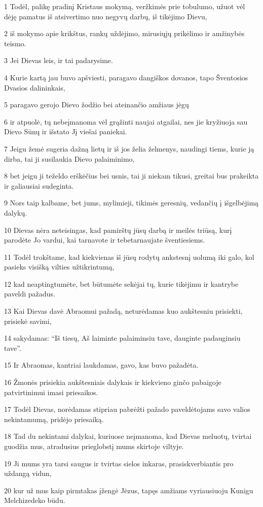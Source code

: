 \par 1 Todėl, palikę pradinį Kristaus mokymą, veržkimės prie tobulumo, užuot vėl dėję pamatus iš atsivertimo nuo negyvų darbų, iš tikėjimo Dievu, 
\par 2 iš mokymo apie krikštus, rankų uždėjimo, mirusiųjų prikėlimo ir amžinybės teismo. 
\par 3 Jei Dievas leis, ir tai padarysime. 
\par 4 Kurie kartą jau buvo apšviesti, paragavo dangiškos dovanos, tapo Šventosios Dvasios dalininkais, 
\par 5 paragavo gerojo Dievo žodžio bei ateinančio amžiaus jėgų 
\par 6 ir atpuolė, tų nebeįmanoma vėl grąžinti naujai atgailai, nes jie kryžiuoja sau Dievo Sūnų ir išstato Jį viešai paniekai. 
\par 7 Jeigu žemė sugeria dažną lietų ir iš jos želia želmenys, naudingi tiems, kurie ją dirba, tai ji susilaukia Dievo palaiminimo, 
\par 8 bet jeigu ji teželdo erškėčius bei usnis, tai ji niekam tikusi, greitai bus prakeikta ir galiausiai sudeginta. 
\par 9 Nors taip kalbame, bet jums, mylimieji, tikimės geresnių, vedančių į išgelbėjimą dalykų. 
\par 10 Dievas nėra neteisingas, kad pamirštų jūsų darbą ir meilės triūsą, kurį parodėte Jo vardui, kai tarnavote ir tebetarnaujate šventiesiems. 
\par 11 Todėl trokštame, kad kiekvienas iš jūsų rodytų ankstesnį uolumą iki galo, kol pasieks visišką vilties užtikrintumą,­ 
\par 12 kad neaptingtumėte, bet būtumėte sekėjai tų, kurie tikėjimu ir kantrybe paveldi pažadus. 
\par 13 Kai Dievas davė Abraomui pažadą, neturėdamas kuo aukštesniu prisiekti, prisiekė savimi, 
\par 14 sakydamas: “Iš tiesų, Aš laiminte palaiminsiu tave, dauginte padauginsiu tave”. 
\par 15 Ir Abraomas, kantriai laukdamas, gavo, kas buvo pažadėta. 
\par 16 Žmonės prisiekia aukštesniais dalykais ir kiekvieno ginčo pabaigoje patvirtinimui imasi priesaikos. 
\par 17 Todėl Dievas, norėdamas stipriau pabrėžti pažado paveldėtojams savo valios nekintamumą, pridėjo priesaiką. 
\par 18 Tad du nekintami dalykai, kuriuose neįmanoma, kad Dievas meluotų, tvirtai guodžia mus, atradusius prieglobstį mums skirtoje viltyje. 
\par 19 Ji mums yra tarsi saugus ir tvirtas sielos inkaras, prasiskverbiantis pro uždangą vidun, 
\par 20 kur už mus kaip pirmtakas įžengė Jėzus, tapęs amžiams vyriausiuoju Kunigu Melchizedeko būdu.


